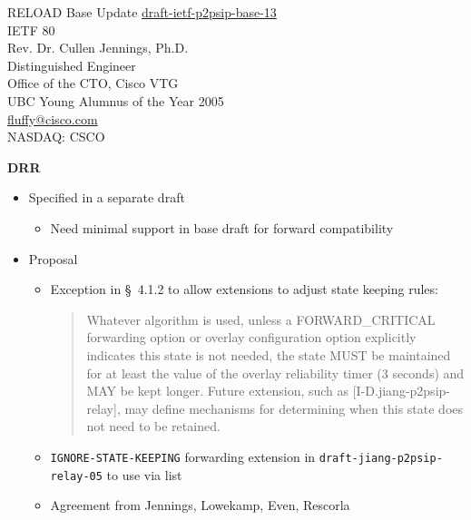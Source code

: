 \documentclass[helvetica]{seminar}
\newcommand{\heading}[1]{%
  \begin{center} 
    \large\bf 
    #1 
  \end{center} 
  \vspace{.4 in}}
\begin{document}
\begin{slide}
\begin{center}
\vspace{-.5in}
\LARGE{{\bf}RELOAD Base Update}
\large{\url{draft-ietf-p2psip-base-13}}\\
\large{{IETF 80}} \\
\vspace{.2in}
\large{
Rev. Dr. Cullen Jennings, Ph.D. \\
Distinguished Engineer\\
Office of the CTO, Cisco VTG\\
UBC Young Alumnus of the Year 2005\\
\url{fluffy@cisco.com}\\
\vspace{1em}
NASDAQ: CSCO
}
\end{center}

\end{slide}


\centerslidesfalse 





\begin{slide}
\heading{DRR}

\vspace{-.4in}
\begin{itemize}
\item Specified in a separate draft
  \begin{itemize}
  \item Need minimal support in base draft for forward compatibility
  \end{itemize}

\item Proposal
  \begin{itemize}
  \item Exception in \S\ 4.1.2 to allow extensions to adjust state keeping rules:
    \small{
    \begin{quote}
      Whatever algorithm is used, unless a FORWARD\_CRITICAL forwarding
      option or overlay configuration option explicitly indicates this
      state is not needed, the state MUST be maintained for at least the
      value of the overlay reliability timer (3 seconds) and MAY be kept
      longer.  Future extension, such as [I-D.jiang-p2psip-relay], may
      define mechanisms for determining when this state does not need to be
      retained.
 \end{quote}
}
  \item \verb^IGNORE-STATE-KEEPING^ forwarding extension in \verb^draft-jiang-p2psip-relay-05^ to use via list
  \item Agreement from Jennings, Lowekamp, Even, Rescorla
  \end{itemize}
\end{itemize}
                

\end{slide}
\end{document}
